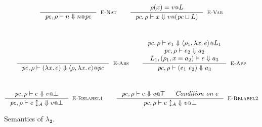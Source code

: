 \documentclass{article}
\makeatletter
\newcommand{\at}{\ensuremath{{\scriptstyle{@}}}}
\newcommand{\pc}{\ensuremath{{\mathit{pc}}}}
\theoremstyle{definition}
\makeatother
\begin{document}
\begin{figure}[h]
  \centering
  \begin{gather*}
    \inference{}{
      \pc, \rho |- n \Downarrow n \at \pc
    }[\textsc{E-Nat}]
    \qquad
    \inference{
      \rho(x) = v \at L
    }{
      \pc, \rho |- x \Downarrow v \at (\pc \sqcup L)
    }[\textsc{E-Var}]
    \\[6ex]
    \inference{}{
      \pc, \rho |- (\lambda{x}.\, e) \Downarrow
      \langle{\rho, \lambda{x}.\, e\rangle} \at \pc
    }[\textsc{E-Abs}]
    \qquad
    \inference{
      \pc, \rho |- e_1 \Downarrow
      \langle{\rho_1, \lambda{x}.\, e\rangle} \at L_1
      \\
      \pc, \rho |- e_2 \Downarrow a_2
      \\
      L_1, (\rho_1, x = a_2) |- e \Downarrow a_3
    }{
      \pc, \rho |- (e_1\ e_2) \Downarrow a_3
    }[\textsc{E-App}]
    \\[6ex]
    \inference{
      \pc, \rho |- e \Downarrow v \at \bot
    }{
      \pc, \rho |- e \updownarrow_{A}\; \Downarrow v \at \bot
    }[\textsc{E-Relabel1}]
    \qquad
    \inference{
      \pc, \rho |- e \Downarrow v \at \top
      &
      \textit{Condition on } e
    }{
      \pc, \rho |- e \updownarrow_{A}\; \Downarrow v \at \bot
    }[\textsc{E-Relabel2}]
  \end{gather*}
  \caption{Semantics of $\lambda_{\mathbf{2}}$.}
  \label{fig:semantics}
\end{figure}

\pagebreak
\end{document}
